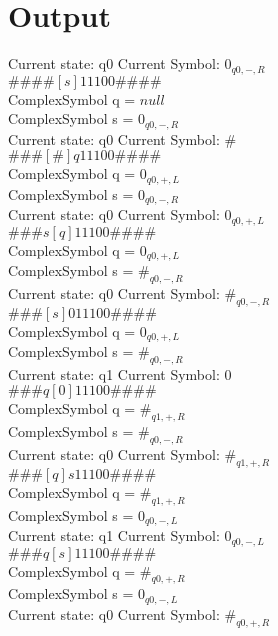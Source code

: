 \documentclass[10pt, a4paper]{article}
\begin{document}
\section*{Output}


Current state: q0	 Current Symbol: 	 $0_{q0,-,R}$\\
$\# \#\# \# [ s ] 1 1 1 0 0 \# \# \# \# $ \\
ComplexSymbol q = $null$ \\
ComplexSymbol s = $0_{q0,-,R}$ \\ 
 \medskip
Current state: q0	 Current Symbol: 	 $\#$\\
$\# \#\# [ \# ] q 1 1 1 0 0 \# \# \# \# $ \\
ComplexSymbol q = $0_{q0,+,L}$ \\
ComplexSymbol s = $0_{q0,-,R}$ \\ 
 \medskip
Current state: q0	 Current Symbol: 	 $0_{q0,+,L}$\\
$\# \#\# s [ q ] 1 1 1 0 0 \# \# \# \# $ \\
ComplexSymbol q = $0_{q0,+,L}$ \\
ComplexSymbol s = $\#_{q0,-,R}$ \\ 
 \medskip
Current state: q0	 Current Symbol: 	 $\#_{q0,-,R}$\\
$\# \#\# [ s ] 0 1 1 1 0 0 \# \# \# \# $ \\
ComplexSymbol q = $0_{q0,+,L}$ \\
ComplexSymbol s = $\#_{q0,-,R}$ \\ 
 \medskip
Current state: q1	 Current Symbol: 	 $0$\\
$\# \#\# q [ 0 ] 1 1 1 0 0 \# \# \# \# $ \\
ComplexSymbol q = $\#_{q1,+,R}$ \\
ComplexSymbol s = $\#_{q0,-,R}$ \\ 
 \medskip
Current state: q0	 Current Symbol: 	 $\#_{q1,+,R}$\\
$\# \#\# [ q ] s 1 1 1 0 0 \# \# \# \# $ \\
ComplexSymbol q = $\#_{q1,+,R}$ \\
ComplexSymbol s = $0_{q0,-,L}$ \\ 
 \medskip
Current state: q1	 Current Symbol: 	 $0_{q0,-,L}$\\
$\# \#\# q [ s ] 1 1 1 0 0 \# \# \# \# $ \\
ComplexSymbol q = $\#_{q0,+,R}$ \\
ComplexSymbol s = $0_{q0,-,L}$ \\ 
 \medskip
Current state: q0	 Current Symbol: 	 $\#_{q0,+,R}$\\
\end{document}
